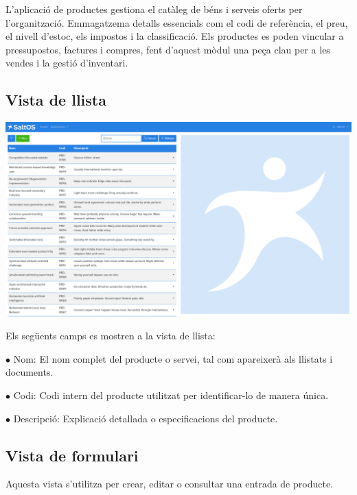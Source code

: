 \documentclass[a4paper]{article}
\begin{document}
L'aplicació de productes gestiona el catàleg de béns i serveis oferts per l'organització.
Emmagatzema detalls essencials com el codi de referència, el preu, el nivell d'estoc, els impostos i la classificació.
Els productes es poden vincular a pressupostos, factures i compres, fent d'aquest mòdul una peça clau per a les vendes i la gestió d'inventari.

\hypertarget{toc153}{}
\subsection{Vista de llista}

\begin{center}\includegraphics[width=1\textwidth]{../ujest/snaps/test-screenshots-js-screenshots-sales-products-list-ca-es-1-snap.png}\end{center}

Els següents camps es mostren a la vista de llista:

\begin{compactitem}
\item[\color{myblue}$\bullet$] Nom: El nom complet del producte o servei, tal com apareixerà als llistats i documents.
\item[\color{myblue}$\bullet$] Codi: Codi intern del producte utilitzat per identificar-lo de manera única.
\item[\color{myblue}$\bullet$] Descripció: Explicació detallada o especificacions del producte.
\end{compactitem}

\hypertarget{toc154}{}
\subsection{Vista de formulari}

Aquesta vista s'utilitza per crear, editar o consultar una entrada de producte.
\end{document}
